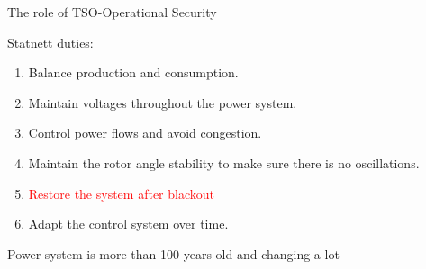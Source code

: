 \documentclass{beamer}
\begin{document}
\begin{frame}{The role of TSO-Operational Security}
\vskip -0.4cm
\begin{block}{Statnett duties:}
{\tiny
\begin{enumerate}
\item<1-> Balance production and consumption.
\item<2-> Maintain voltages throughout the power system.
\item<3-> Control power flows and avoid congestion.
\item<4-> Maintain the rotor angle stability to make sure there is no oscillations.
 
\item<5->    \hspace*{.1\linewidth}\begin{minipage}{.8\linewidth}
\begin{alertblock}{}
\textcolor{red}{Restore the system after blackout}
\end{alertblock} 
    \end{minipage}
   
\item<6-> Adapt the control system over time.
\end{enumerate}
}
\end{block}
 { \begin{alertblock}{}
Power system is more than 100 years old and changing a lot
\end{alertblock}
\begin{center}


\end{center}}
\end{frame}
\end{document}

